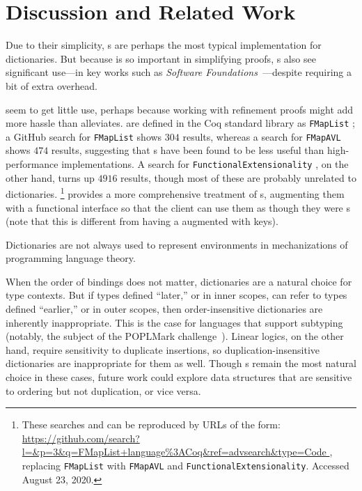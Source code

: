 \section{Discussion and Related Work}
\label{sec:Discussion}

\vspace{0.05in} %


%
Due to their simplicity, {\sal}s are perhaps the most typical implementation for dictionaries.
%
But because \SemInj{} is so important in simplifying proofs, {\FPF}s also see significant use---in key works such as \emph{Software Foundations}~\cite[Maps]{Pierce:SF1}---despite requiring a bit of extra overhead.


\Cals{} seem to get little use, perhaps because working with refinement proofs might add more hassle than \SemInj{} alleviates.
%
\Cals{} are defined in the Coq standard library as \texttt{FMapList} \citep{FMapList}; a GitHub search for \texttt{FMapList} shows $304$ results,
%
whereas a search for \texttt{FMapAVL} shows $474$ results, suggesting that {\cal}s have been found to be less useful than high-performance implementations.
%
A search for \texttt{FunctionalExtensionality} \citep{FunExt}, on the other hand, turns up $4916$ results, though most of these are probably unrelated to dictionaries.
\footnote{
%
These searches and can be reproduced by URLs of the form:
\url{https://github.com/search?l=\&p=3\&q=FMapList+language\%3ACoq\&ref=advsearch\&type=Code },
replacing \texttt{FMapList} with \texttt{FMapAVL} and \texttt{FunctionalExtensionality}.
%
Accessed August 23, 2020.
%
}
%
\citet{Amorim:fmap} provides a more comprehensive treatment of {\cal}s, augmenting them with a functional interface so that the client can
%
use them as though they were {\fpf}s (note that this is different from having a \fpf{} augmented with keys).



Dictionaries are not always used to represent environments in mechanizations of programming language theory.

When the order of bindings does not matter, dictionaries are a natural choice for type contexts.
%
But if types defined ``later,'' or in inner scopes, can refer to types defined ``earlier,'' or in outer scopes, then order-insensitive dictionaries are inherently inappropriate.
%
This is the case for languages that support subtyping (notably, the subject of the POPLMark challenge~\citep{XXX}).
%
Linear logics, on the other hand, require sensitivity to duplicate insertions, so duplication-insensitive dictionaries are inappropriate for them as well.
%
Though {\sal}s remain the most natural choice in these cases, future work could explore data structures that are sensitive to ordering but not duplication, or vice versa.

